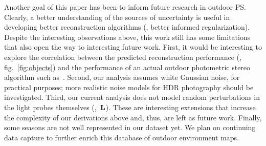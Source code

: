 Another goal of this paper has been to inform future research in outdoor PS. Clearly, a better understanding of the sources of uncertainty is useful in developing better reconstruction algorithms (\eg, better informed regularization). Despite the interesting observations above, this work still has some limitations that also open the way to interesting future work. First, it would be interesting to explore the correlation between the predicted reconstruction performance (\eg, fig.~\ref{fig:objects}) and the performance of an actual outdoor photometric stereo algorithm such as~\cite{yu-iccp-13}. Second, our analysis assumes white Gaussian noise, for practical purposes; more realistic noise models for HDR photography should be investigated. Third, our current analysis does not model random perturbations in the light probes themselves (\ie,~${\bf L}$). These are interesting extensions that increase the complexity of our derivations above and, thus, are left as future work. Finally, some seasons are not well represented in our dataset yet. We plan on continuing data capture to further enrich this database of outdoor environment maps.
